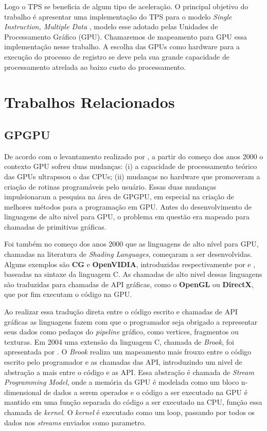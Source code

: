   Logo o TPS se beneficia de algum tipo de aceleração. O principal objetivo do
trabalho é apresentar uma implementação do TPS para o modelo \textit{Single
Instruction, Multiple Data} \cite{patterson2013computer}, modelo esse adotado
pelas Unidades de Processamento Gráfico (GPU). Chamaremos de mapeamento para GPU
essa implementação nesse trabalho. A escolha das GPUs como hardware para a
execução do processo de registro se deve pela sua grande capacidade de
processamento atrelada ao baixo custo do processamento.
\section{Trabalhos Relacionados}
\label{sec:trabalhosRelacionados}

\subsection{GPGPU}

  De acordo com o levantamento realizado por \cite{owens2007survey}, a partir do
começo dos anos 2000 o contexto GPU sofreu duas mudanças: (i) a capacidade de
processamento teórico das GPUs ultrapssou o das CPUs; (ii) mudanças no hardware
que promoveram a criação de rotinas programáveis pelo usuário. Essas duas
mudanças impulsionaram a pesquisa na área de GPGPU, em especial na criação de
melhores métodos para a programação em GPU. Antes do desenvolvimento de
linguagens de alto nivel para GPU, o problema em questão era mapeado para
chamadas de primitivas gráficas.

  Foi também no começo dos anos 2000 que as linguagens de alto nível para GPU,
chamadas na literatura de \textit{Shading Languages}, começaram a ser
desenvolvidas. Alguns exemplos são \textbf{CG} e \textbf{OpenVIDIA},
introduzidas respectivamente por \cite{mark2003cg} e \cite{fung2005openvidia},
baseadas na sintaxe da linguagem C. As chamadas de alto nivel dessas linguagens
são traduzidas para chamadas de API gráficas, como o \textbf{OpenGL} ou
\textbf{DirectX}, que por fim executam o código na GPU.

  Ao realizar essa tradução direta entre o código escrito e chamadas de API
gráficas as linguagens fazem com que o programador seja obrigado a representar
seus dados como pedaços do  \textit{pipeline} gráfico, como vertices, fragmentos
ou texturas. Em 2004 uma extensão da linguagem C, chamada de \textit{Brook},
foi apresentada por \cite{buck2004brook}. O \textit{Brook} realiza um mapeamento
mais frouxo entre o código escrito pelo programador e as chamadas das API,
introduzindo um nivel de abstração a mais entre o código e as API. Essa
abstração é chamada de \textit{Stream Programming Model}, onde a memória da GPU
é modelada como um bloco n-dimensional de dados a serem operados e o código a
ser executado na GPU é mantido em uma função separada do código a ser executado
na CPU, função essa chamada de \textit{kernel}. O \textit{kernel} é executado
como um loop, passando por todos os dados nos \textit{streams} enviados como
parametro.

